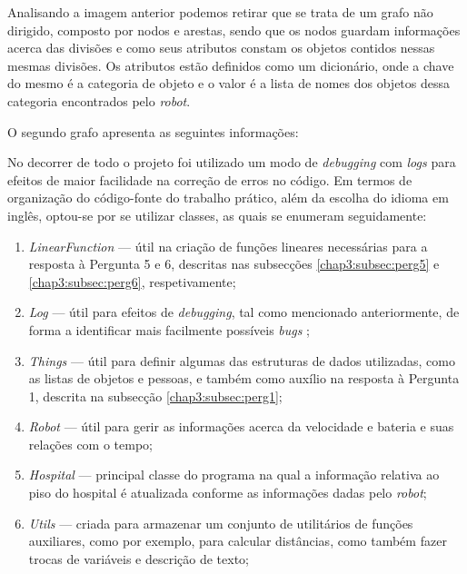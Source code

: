 Analisando a imagem anterior podemos retirar que se trata de um grafo não dirigido, composto por nodos e arestas, sendo que os nodos guardam informações acerca das divisões e como seus atributos constam os objetos contidos nessas mesmas divisões. Os atributos estão definidos como um dicionário, onde a chave do mesmo é a categoria de objeto e o valor é a lista de nomes dos objetos dessa categoria encontrados pelo \emph{robot}.

O segundo grafo apresenta as seguintes informações:

\begin{figure}[!htb]
\centering
\end{figure}



No decorrer de todo o projeto foi utilizado um modo de \emph{debugging} com \emph{logs} para efeitos de maior facilidade na correção de erros no código.
Em termos de organização do código-fonte do trabalho prático, além da escolha do idioma em inglês, optou-se por se utilizar classes, as quais se enumeram seguidamente:

\begin{enumerate}
	\item \emph{LinearFunction} --- útil na criação de funções lineares necessárias para a resposta à Pergunta 5 e 6, descritas nas subsecções \ref{chap3:subsec:perg5} e \ref{chap3:subsec:perg6}, respetivamente;
	\item \emph{Log} --- útil para efeitos de \emph{debugging}, tal como mencionado anteriormente, de forma a identificar mais facilmente possíveis \emph{bugs} ;
	\item \emph{Things} --- útil para definir algumas das estruturas de dados utilizadas, como as listas de objetos e pessoas, e também como auxílio na resposta à Pergunta 1, descrita na subsecção \ref{chap3:subsec:perg1};
	\item \emph{Robot} --- útil para gerir as informações acerca da velocidade e bateria e suas relações com o tempo;
	\item \emph{Hospital} --- principal classe do programa na qual a informação relativa ao piso do hospital é atualizada conforme as informações dadas pelo \emph{robot};
	\item \emph{Utils} --- criada para armazenar um conjunto de utilitários de funções auxiliares, como por exemplo, para calcular distâncias, como também fazer trocas de variáveis e descrição de texto;
\end{enumerate}

